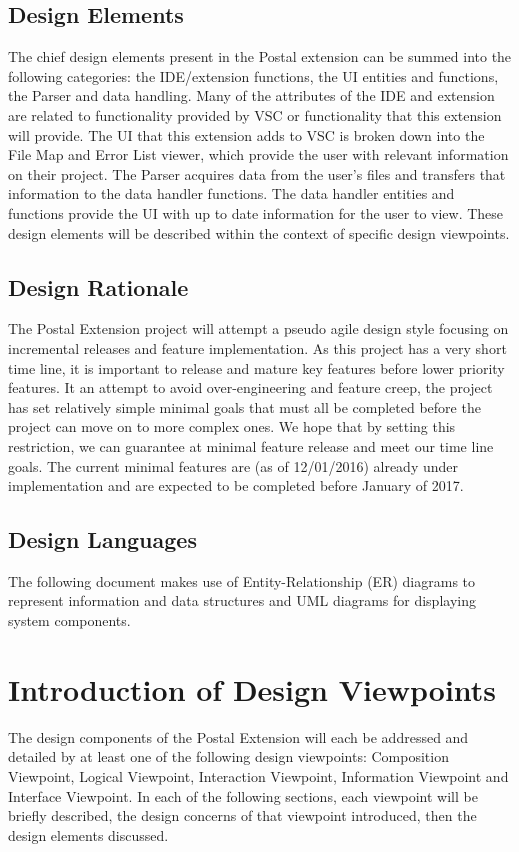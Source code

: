 \documentclass[letterpaper,10pt,titlepage,draftclsnofoot,onecolumn,onesided] {IEEEtran}
\begin{document}
\subsection{Design Elements}
The chief design elements present in the Postal extension can be summed into the following categories: the IDE/extension functions, the UI entities and functions, the Parser and data handling.
Many of the attributes of the IDE and extension are related to functionality provided by VSC or functionality that this extension will provide. 
The UI that this extension adds to VSC is broken down into the File Map and Error List viewer, which provide the user with relevant information on their project.
The Parser acquires data from the user's files and transfers that information to the data handler functions.
The data handler entities and functions provide the UI with up to date information for the user to view.
These design elements will be described within the context of specific design viewpoints.

\subsection{Design Rationale}
The Postal Extension project will attempt a pseudo agile design style focusing on incremental releases and feature implementation.
As this project has a very short time line, it is important to release and mature key features before lower priority features. 
It an attempt to avoid over-engineering and feature creep, the project has set relatively simple minimal goals that must all be completed before the project can move on to more complex ones.
We hope that by setting this restriction, we can guarantee at minimal feature release and meet our time line goals.
The current minimal features are (as of 12/01/2016) already under implementation and are expected to be completed before January of 2017. %

\subsection{Design Languages}
The following document makes use of Entity-Relationship (ER) diagrams to represent information and data structures and UML diagrams for displaying system components. 

\section{Introduction of Design Viewpoints}
The design components of the Postal Extension will each be addressed and detailed by at least one of the following design viewpoints: Composition Viewpoint, Logical Viewpoint, Interaction Viewpoint, Information Viewpoint and Interface Viewpoint.
In each of the following sections, each viewpoint will be briefly described, the design concerns of that viewpoint introduced, then the design elements discussed.
\end{document}
